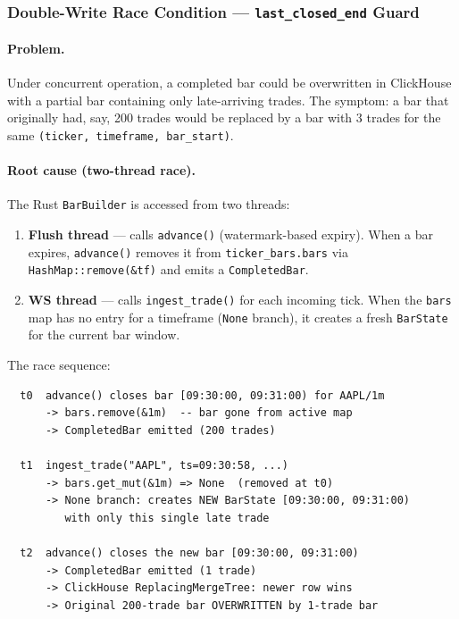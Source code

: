 \documentclass[a4paper, 11pt]{article}
\begin{document}
\subsubsection{Double-Write Race Condition --- \texttt{last\_closed\_end} Guard}
\label{sec:double-write-fix}

\paragraph{Problem.}
Under concurrent operation, a completed bar could be overwritten in ClickHouse
with a partial bar containing only late-arriving trades.  The symptom: a bar
that originally had, say, 200 trades would be replaced by a bar with 3 trades
for the same \texttt{(ticker, timeframe, bar\_start)}.

\paragraph{Root cause (two-thread race).}
The Rust \texttt{BarBuilder} is accessed from two threads:

\begin{enumerate}[nosep]
    \item \textbf{Flush thread} --- calls \texttt{advance()} (watermark-based
          expiry).  When a bar expires, \texttt{advance()} removes it from
          \texttt{ticker\_bars.bars} via \texttt{HashMap::remove(\&tf)} and
          emits a \texttt{CompletedBar}.
    \item \textbf{WS thread} --- calls \texttt{ingest\_trade()} for each
          incoming tick.  When the \texttt{bars} map has no entry for a
          timeframe (\texttt{None} branch), it creates a fresh
          \texttt{BarState} for the current bar window.
\end{enumerate}

\noindent The race sequence:

\begin{verbatim}
  t0  advance() closes bar [09:30:00, 09:31:00) for AAPL/1m
      -> bars.remove(&1m)  -- bar gone from active map
      -> CompletedBar emitted (200 trades)

  t1  ingest_trade("AAPL", ts=09:30:58, ...)
      -> bars.get_mut(&1m) => None  (removed at t0)
      -> None branch: creates NEW BarState [09:30:00, 09:31:00)
         with only this single late trade

  t2  advance() closes the new bar [09:30:00, 09:31:00)
      -> CompletedBar emitted (1 trade)
      -> ClickHouse ReplacingMergeTree: newer row wins
      -> Original 200-trade bar OVERWRITTEN by 1-trade bar
\end{verbatim}
\end{document}
